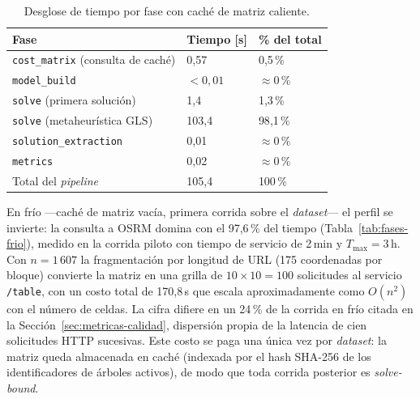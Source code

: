 \begin{enumerate}
\begin{table}[H]
  \centering
  \caption{Desglose de tiempo por fase con caché de matriz caliente.}
  \label{tab:fases-caliente}
  \begin{tabularx}{\textwidth}{lXX}
    \toprule
    Fase &
      Tiempo [s] &
      \% del total \\
    \midrule
    \texttt{cost\_matrix} (consulta de caché) &
      0{,}57 &
      0{,}5\,\% \\
    \texttt{model\_build} &
      $<0{,}01$ &
      $\approx 0$\,\% \\
    \texttt{solve} (primera solución) &
      1{,}4 &
      1{,}3\,\% \\
    \texttt{solve} (metaheurística GLS) &
      103{,}4 &
      98{,}1\,\% \\
    \texttt{solution\_extraction} &
      0{,}01 &
      $\approx 0$\,\% \\
    \texttt{metrics} &
      0{,}02 &
      $\approx 0$\,\% \\
    \midrule
    Total del \textit{pipeline} &
      105{,}4 &
      100\,\% \\
    \bottomrule
  \end{tabularx}
\end{table}

En frío ---caché de matriz vacía, primera corrida sobre el \textit{dataset}--- el perfil se
invierte: la consulta a OSRM domina con el 97,6\,\% del tiempo (Tabla~\ref{tab:fases-frio}), medido
en la corrida piloto con tiempo de servicio de 2\,min y $T_{\max}=3$\,h. Con $n=1\,607$ la
fragmentación por longitud de URL (175 coordenadas por bloque) convierte la matriz en una grilla de
$10 \times 10 = 100$ solicitudes al servicio \texttt{/table}, con un costo total de 170{,}8\,s que
escala aproximadamente como $O(n^2)$ con el número de celdas. La cifra difiere en un 24\,\% de la
corrida en frío citada en la Sección~\ref{sec:metricas-calidad}, dispersión propia de la latencia de
cien solicitudes HTTP sucesivas. Este costo se paga una única vez por \textit{dataset}: la matriz
queda almacenada en caché (indexada por el hash SHA-256 de los identificadores de árboles activos),
de modo que toda corrida posterior es \textit{solve-bound}.


\end{enumerate}
